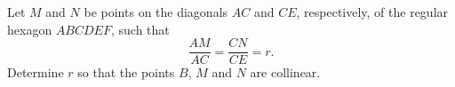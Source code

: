 Let $M$ and $N$ be points on the diagonals $AC$ and $CE$, respectively, of the regular hexagon $ABCDEF$, such that
\[
\dfrac{AM}{AC}=\dfrac{CN}{CE}=r .
\]
Determine $r$ so that the points $B$, $M$ and $N$ are collinear.
